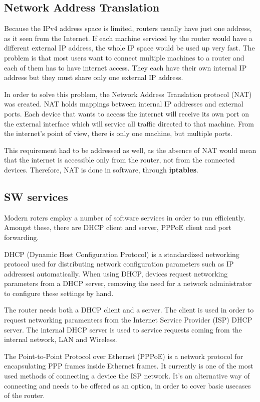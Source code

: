 \subsection{Network Address Translation}
\label{sub-sec:nat}
Because the IPv4 address space is limited, routers usually have just one
address, as it seen from the Internet. If each machine serviced
by the router would have a different external IP address, the whole
IP space would be used up very fast. The problem is that most users
want to connect multiple machines to a router and each of them has to have
internet access. They each have their own internal IP address but they
must share only one external IP address.

In order to solve this problem, the Network Address Translation protocol (NAT)
was created. NAT holds mappings between internal IP addresses and external 
ports. Each device that wants to access the internet will receive its own
port on the external interface which will service all traffic directed
to that machine. From the internet's point of view, there is only one
machine, but multiple ports.

This requirement had to be addressed as well, as the absence of NAT would
mean that the internet is accessible only from the router, not from
the connected devices. Therefore, NAT is done in software, through 
\textbf{iptables}.

\subsection{SW services}
\label{sub-sec:sw-services}
Modern roters employ a number of software services in order to run
efficiently. Amongst these, there are DHCP client and server,
PPPoE client and port forwarding.

DHCP (Dynamic Host Configuration Protocol) is a standardized networking
protocol used for distributing network configuration parameters such as
IP addressesi automatically. When using DHCP, devices request networking parameters
from a DHCP server, removing the need for a network administrator to
configure these settings by hand.

The router needs both a DHCP client and a server. The client is used in
order to request networking paramenters from the Internet Service Provider 
(ISP) DHCP server. The internal DHCP server is used to service requests coming
from the internal network, LAN and Wireless.

The Point-to-Point Protocol over Ethernet (PPPoE) is a network protocol
for encapsulating PPP frames inside Ethernet frames. It currently is one
of the most used methods of connecting a device the ISP network.
It's an alternative way of connecting and needs to be offered as an option,
in order to cover basic usecases of the router.

